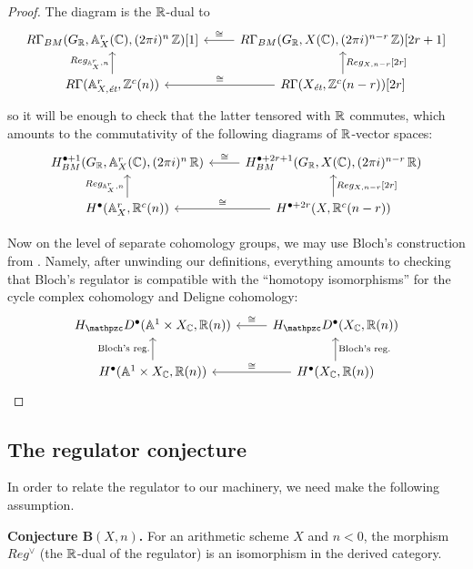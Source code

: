 \begin{lemma}
  \begin{proof}
    The diagram is the $\mathbb{R}$-dual to
    \[ \begin{tikzcd}
        R\Gamma_{BM} (G_\RR, \AA^r_X (\CC), (2\pi i)^n\,\ZZ) [1] & R\Gamma_{BM} (G_\RR, X (\CC), (2\pi i)^{n-r}\,\ZZ) [2r+1] \ar{l}[swap]{\isom} \\
        R\Gamma (\AA^r_{X,\text{\it ét}}, \ZZ^c (n)) \ar{u}{Reg_{\AA^r_X,n}} & R\Gamma (X_\text{\it ét}, \ZZ^c (n-r)) [2r] \ar{u}[swap]{Reg_{X,n-r} [2r]} \ar{l}[swap]{\isom}
      \end{tikzcd} \]
    so it will be enough to check that the latter tensored with $\mathbb{R}$ commutes,
    which amounts to the commutativity of the following diagrams of $\mathbb{R}$-vector
    spaces:
    \[ \begin{tikzcd}
        H_{BM}^{\bullet+1} (G_\RR, \AA^r_X (\CC), (2\pi i)^n\,\RR) & H_{BM}^{\bullet + 2r+1} (G_\RR, X (\CC), (2\pi i)^{n-r}\,\RR) \ar{l}[swap]{\isom} \\
        H^\bullet (\AA^r_X, \RR^c (n)) \ar{u}{Reg_{\AA^r_X,n}} & H^{\bullet+2r} (X, \RR^c (n-r)) \ar{u}[swap]{Reg_{X,n-r} [2r]} \ar{l}[swap]{\isom}
      \end{tikzcd} \]

    Now on the level of separate cohomology groups, we may use Bloch's
    construction from \cite{Bloch-1986-Lefschetz}. Namely, after unwinding our
    definitions, everything amounts to checking that Bloch's regulator is
    compatible with the ``homotopy isomorphisms'' for the cycle complex
    cohomology and Deligne cohomology:
    \[ \begin{tikzcd}
        H_\mathcal{D}^\bullet (\AA^1 \times X_\CC, \RR (n)) & H_\mathcal{D}^\bullet (X_\CC, \RR (n)) \ar{l}[swap]{\isom} \\
        H^\bullet (\AA^1 \times X_\CC, \RR (n)) \ar{u}{\text{Bloch's reg.}} & H^\bullet (X_\CC, \RR (n)) \ar{u}[swap]{\text{Bloch's reg.}} \ar{l}[swap]{\isom}
      \end{tikzcd} \]
  \end{proof}
\end{lemma}

\subsection*{The regulator conjecture}

In order to relate the regulator to our machinery, we need make the following
assumption.

\begin{nameless}\textbf{Conjecture $\mathbf{B} (X,n)$.}
  \label{conjecture:B(X,n)}
  For an arithmetic scheme $X$ and $n < 0$, the morphism $Reg^\vee$
  (the $\mathbb{R}$-dual of the regulator) is an isomorphism in the derived category.
\end{nameless}

